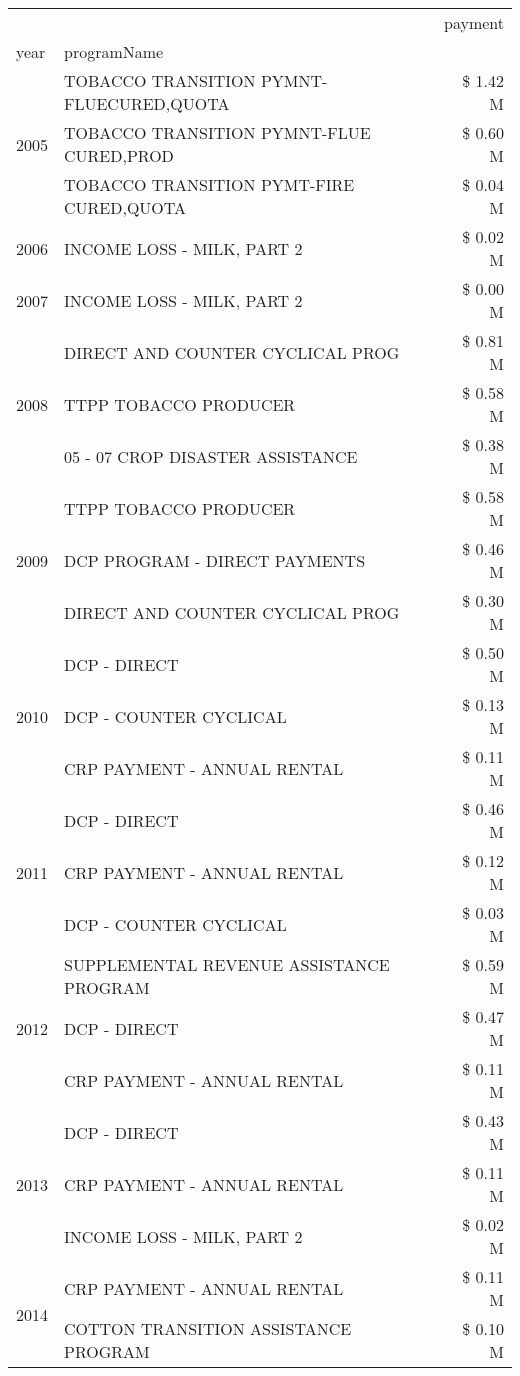 \begin{tabular}{llr}
\toprule
 &  & payment \\
year & programName &  \\
\midrule
\multirow[t]{3}{*}{2005} & TOBACCO TRANSITION PYMNT-FLUECURED,QUOTA & \$ 1.42 M \\
 & TOBACCO TRANSITION PYMNT-FLUE CURED,PROD & \$ 0.60 M \\
 & TOBACCO TRANSITION PYMT-FIRE CURED,QUOTA & \$ 0.04 M \\
\cline{1-3}
2006 & INCOME LOSS - MILK, PART 2 & \$ 0.02 M \\
\cline{1-3}
2007 & INCOME LOSS - MILK, PART 2 & \$ 0.00 M \\
\cline{1-3}
\multirow[t]{3}{*}{2008} & DIRECT AND COUNTER CYCLICAL PROG & \$ 0.81 M \\
 & TTPP TOBACCO PRODUCER & \$ 0.58 M \\
 & 05 - 07 CROP DISASTER ASSISTANCE & \$ 0.38 M \\
\cline{1-3}
\multirow[t]{3}{*}{2009} & TTPP TOBACCO PRODUCER & \$ 0.58 M \\
 & DCP PROGRAM - DIRECT PAYMENTS & \$ 0.46 M \\
 & DIRECT AND COUNTER CYCLICAL PROG & \$ 0.30 M \\
\cline{1-3}
\multirow[t]{3}{*}{2010} & DCP - DIRECT & \$ 0.50 M \\
 & DCP - COUNTER CYCLICAL & \$ 0.13 M \\
 & CRP PAYMENT - ANNUAL RENTAL & \$ 0.11 M \\
\cline{1-3}
\multirow[t]{3}{*}{2011} & DCP - DIRECT & \$ 0.46 M \\
 & CRP PAYMENT - ANNUAL RENTAL & \$ 0.12 M \\
 & DCP - COUNTER CYCLICAL & \$ 0.03 M \\
\cline{1-3}
\multirow[t]{3}{*}{2012} & SUPPLEMENTAL REVENUE ASSISTANCE PROGRAM & \$ 0.59 M \\
 & DCP - DIRECT & \$ 0.47 M \\
 & CRP PAYMENT - ANNUAL RENTAL & \$ 0.11 M \\
\cline{1-3}
\multirow[t]{3}{*}{2013} & DCP - DIRECT & \$ 0.43 M \\
 & CRP PAYMENT - ANNUAL RENTAL & \$ 0.11 M \\
 & INCOME LOSS - MILK, PART 2 & \$ 0.02 M \\
\cline{1-3}
\multirow[t]{3}{*}{2014} & CRP PAYMENT - ANNUAL RENTAL & \$ 0.11 M \\
 & COTTON TRANSITION ASSISTANCE PROGRAM & \$ 0.10 M \\

\end{tabular}
